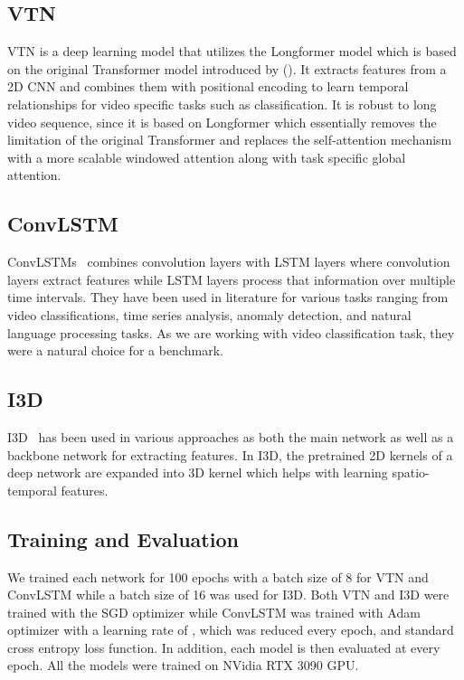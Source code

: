 \documentclass[letterpaper]{article}
\begin{document}
\subsection{VTN}

VTN is a deep learning model that utilizes the Longformer \cite{longformer} model which is based on the original Transformer model introduced by \citeauthor{transformer} (\citeyear{transformer}).  It extracts features from a 2D CNN and combines them with positional encoding to learn temporal relationships for video specific tasks such as classification. It is robust to long video sequence, since it is based on Longformer which essentially removes the limitation of the original Transformer and replaces the self-attention mechanism with a more scalable windowed attention along with task specific global attention.

\subsection{ConvLSTM}

ConvLSTMs~\cite{lstm1,lstm2} combines convolution layers with LSTM layers where convolution layers extract features while LSTM layers process that information over multiple time intervals. They have been used in literature for various tasks ranging from video classifications, time series analysis, anomaly detection, and natural language processing tasks. As we are working with video classification task, they were a natural choice for a benchmark.

\subsection{I3D}

I3D~\cite{i3d} has been used in various approaches as both the main network as well as a backbone network for extracting features. In I3D, the pretrained 2D kernels of a deep network are expanded into 3D kernel which helps with learning spatio-temporal features. 


\subsection{Training and Evaluation}
We trained each network for 100 epochs with a batch size of 8 for VTN and ConvLSTM while a batch size of 16 was used for I3D. Both VTN and I3D were trained with the SGD optimizer while ConvLSTM was trained with Adam optimizer with a learning rate of , which was reduced every  epoch, and standard cross entropy loss function. In addition, each model is then evaluated at every  epoch. All the models were trained on NVidia RTX 3090 GPU. 
\end{document}
